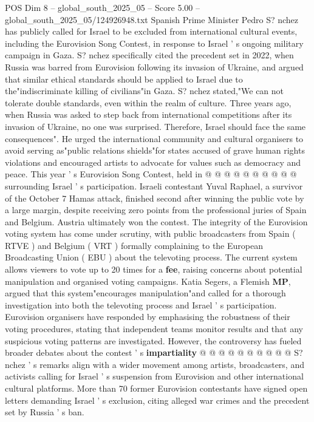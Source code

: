 \begin{textsample}{POS Dim 8 – global\_south\_2025\_05 – Score 5.00 – global\_south\_2025\_05/124926948.txt}  \label{ex:f8_pos_134}
Spanish Prime Minister Pedro S? nchez has publicly called for Israel to be excluded from international cultural events, including the Eurovision Song Contest, in response to Israel ' s ongoing military campaign in Gaza.
S? nchez specifically cited the precedent set in 2022, when Russia was barred from Eurovision following its invasion of Ukraine, and argued that similar ethical standards should be applied to Israel due to the"indiscriminate killing of civilians"in Gaza.
S? nchez stated,"We can not tolerate double standards, even within the realm of culture.
Three years ago, when Russia was asked to step back from international competitions after its invasion of Ukraine, no one was surprised.
Therefore, Israel should face the same consequences".
He urged the international community and cultural organisers to avoid serving as"public relations shields"for states accused of grave human rights violations and encouraged artists to advocate for values such as democracy and peace.
This year ' s Eurovision Song Contest, held in @ @ @ @ @ @ @ @ @ @ surrounding Israel ' s participation.
Israeli contestant Yuval Raphael, a survivor of the October 7 Hamas attack, finished second after winning the public vote by a large margin, despite receiving zero points from the professional juries of Spain and Belgium.
Austria ultimately won the contest.
The integrity of the Eurovision voting system has come under scrutiny, with public broadcasters from Spain ( RTVE ) and Belgium ( VRT ) formally complaining to the European Broadcasting Union ( EBU ) about the televoting process.
The current system allows viewers to vote up to 20 times for a \textbf{fee}, raising concerns about potential manipulation and organised voting campaigns.
Katia Segers, a Flemish \textbf{MP}, argued that this system"encourages manipulation"and called for a thorough investigation into both the televoting process and Israel ' s participation.
Eurovision organisers have responded by emphasising the robustness of their voting procedures, stating that independent teams monitor results and that any suspicious voting patterns are investigated.
However, the controversy has fueled broader debates about the contest ' s \textbf{impartiality} @ @ @ @ @ @ @ @ @ @ S? nchez ' s remarks align with a wider movement among artists, broadcasters, and activists calling for Israel ' s suspension from Eurovision and other international cultural platforms.
More than 70 former Eurovision contestants have signed open letters demanding Israel ' s exclusion, citing alleged war crimes and the precedent set by Russia ' s ban.

\end{textsample}
